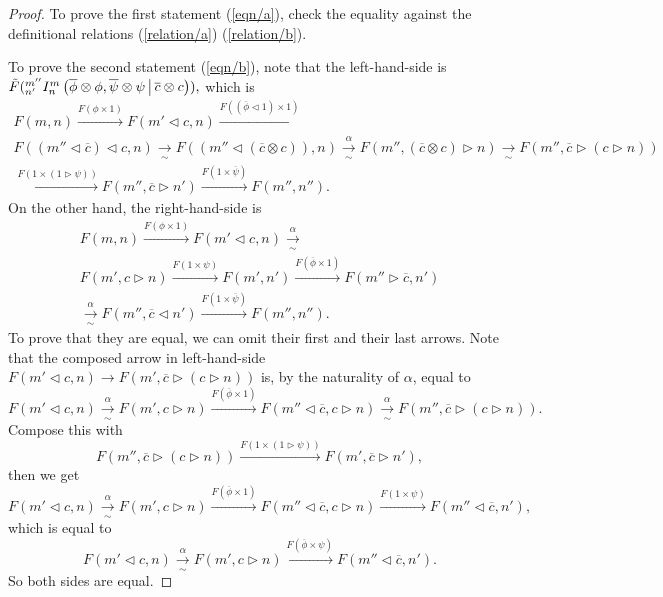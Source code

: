 \begin{proof}
  To prove the first statement (\ref{eqn/a}), check the equality against the
  definitional relations (\ref{relation/a}) (\ref{relation/b}).

  \noindent To prove the second statement (\ref{eqn/b}), note that the
  left-hand-side is
  $\tilde{F}({}^{m''}_{n'} I^{m}_{n} \left( \overline{\phi} \otimes \phi, \overline{\psi} \otimes \psi \,\middle|\, \overline{c} \otimes c \right)),$
  which is
  \begin{multline*}
    F(m,n)
    \xrightarrow{F(\phi \times 1)}
    F(m' \lhd c, n)
    \xrightarrow{F((\overline{\phi} \lhd 1) \times 1)} \\
    F((m'' \lhd \overline{c}) \lhd c, n)
    \xrightarrow[\sim]{}
    F((m'' \lhd (\overline{c} \otimes c)), n)
    \xrightarrow[\sim]{\alpha}
    F(m'', (\overline{c} \otimes c) \rhd n)
    \xrightarrow[\sim]{}
    F(m'', \overline{c} \rhd (c \rhd n)) \\
    \xrightarrow{F(1 \times (1 \rhd \psi))}
    F(m'', \overline{c} \rhd n')
    \xrightarrow{F(1 \times \overline{\psi})}
    F(m'',n'').
  \end{multline*}
  On the other hand, the right-hand-side is
  \begin{multline*}
    F(m,n)
    \xrightarrow{F(\phi \times 1)}
    F(m' \lhd c, n)
    \xrightarrow[\sim]{\alpha} \\
    F(m', c \rhd n)
    \xrightarrow{F(1 \times \psi)}
    F(m', n')
    \xrightarrow{F(\overline{\phi} \times 1)}
    F(m'' \rhd \overline{c}, n') \\
    \xrightarrow[\sim]{\alpha}
    F(m'', \overline{c} \lhd n')
    \xrightarrow{F(1 \times \overline{\psi})}
    F(m'',n'').
  \end{multline*}
  To prove that they are equal, we can omit their first and their last arrows. Note that the composed arrow in left-hand-side $F(m' \lhd c, n) \to F(m', \overline{c} \rhd (c \rhd n))$ is, by the naturality of $\alpha$, equal to
  \[
    F(m' \lhd c, n)
    \xrightarrow[\sim]{\alpha}
    F(m', c \rhd n)
    \xrightarrow{F(\overline{\phi} \times 1)}
    F(m'' \lhd \overline{c}, c \rhd n)
    \xrightarrow[\sim]{\alpha}
    F(m'', \overline{c} \rhd (c \rhd n)).
  \]
  Compose this with
  \[
    F(m'', \overline{c} \rhd (c \rhd n))
    \xrightarrow{F(1 \times (1 \rhd \psi))}
    F(m', \overline{c} \rhd n'),
  \]
  then we get
  \[
    F(m' \lhd c, n)
    \xrightarrow[\sim]{\alpha}
    F(m', c \rhd n)
    \xrightarrow{F(\overline{\phi} \times 1)}
    F(m'' \lhd \overline{c}, c \rhd n)
    \xrightarrow{F(1 \times \psi)}
    F(m'' \lhd \overline{c}, n'),
  \]
  which is equal to
  \[
    F(m' \lhd c, n)
    \xrightarrow[\sim]{\alpha}
    F(m', c \rhd n)
    \xrightarrow{F(\overline{\phi} \times \psi)}
    F(m'' \lhd \overline{c}, n').
  \]
  So both sides are equal.
\end{proof}

